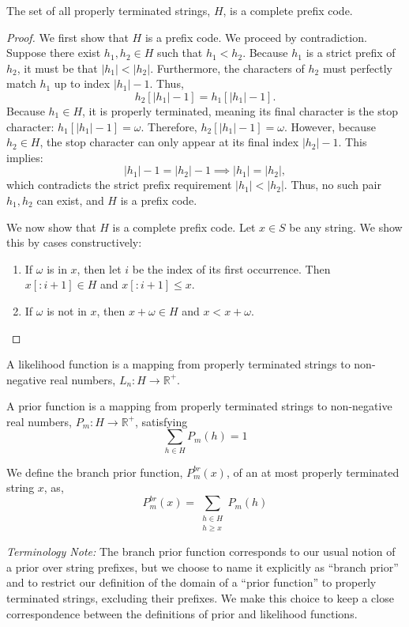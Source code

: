 \begin{proposition}
    The set of all properly terminated strings, $H$, is a complete prefix code.
\end{proposition}
\begin{proof}
    We first show that $H$ is a prefix code.
    We proceed by contradiction.
    Suppose there exist $h_1, h_2 \in H$ such that $h_1 < h_2$.
    Because $h_1$ is a strict prefix of $h_2$, it must be that $|h_1| < |h_2|$.
    Furthermore, the characters of $h_2$ must perfectly match $h_1$ up to index $|h_1|-1$. 
    Thus, 
    $$
    h_2[|h_1|-1] = h_1[|h_1|-1].
    $$
    Because $h_1 \in H$, it is properly terminated, meaning its final character is the stop character: $h_1[|h_1|-1] = \omega$.
    Therefore, $h_2[|h_1|-1] = \omega$.
    However, because $h_2 \in H$, the stop character can only appear at its final index $|h_2|-1$. This implies:
    $$
    |h_1|-1 = |h_2|-1 \implies |h_1| = |h_2|,
    $$
    which contradicts the strict prefix requirement $|h_1| < |h_2|$. Thus, no such pair $h_1, h_2$ can exist, and $H$ is a prefix code.


    We now show that $H$ is a complete prefix code.
    Let $x \in S$ be any string.
    We show this by cases constructively:
    \begin{enumerate}[label=(\alph*)]
        \item If $\omega$ is in $x$,
        then let $i$ be the index of its first occurrence. Then $x[:i+1] \in H$
        and $x[:i+1] \leq x$.
        \item If $\omega$ is not in $x$,
        then $x+\omega \in H$
        and $x < x+\omega$.
    \end{enumerate}
\end{proof}

\begin{definition}
    A likelihood function is a mapping from properly terminated strings to non-negative real numbers,
    $L_n : H \to \mathbb{R}^+$.
\end{definition}

\begin{definition}
\label{def:prior-function}
    A prior function is a mapping from properly terminated strings to non-negative real numbers,
    $P_m : H \to \mathbb{R}^+$,
    satisfying
    $$
    \sum_{h \in H} P_m(h) = 1
    $$
\end{definition}

\begin{definition}
\label{def:branch-prior-function}
    We define the branch prior function, $P^{br}_m(x)$, of an at most properly terminated string $x$,
    as,
    $$
    P^{br}_m(x) = \sum_{\substack{h \in H \\ h \geq x}} P_m(h)
    $$
\end{definition}
\textit{Terminology Note: } The branch prior function corresponds to our usual notion of a prior over
string prefixes, but we choose to name it explicitly as ``branch prior'' and to restrict our definition of the domain of
a ``prior function'' to properly terminated strings,
excluding their prefixes. We make this choice to keep a close correspondence
between the definitions of prior and likelihood functions.

